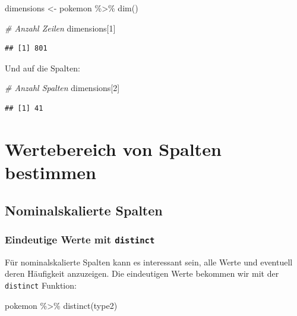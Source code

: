 \documentclass[
]{book}
\newenvironment{Shaded}{\begin{snugshade}}{\end{snugshade}}
\newcommand{\CommentTok}[1]{\textcolor[rgb]{0.56,0.35,0.01}{\textit{#1}}}
\newcommand{\DecValTok}[1]{\textcolor[rgb]{0.00,0.00,0.81}{#1}}
\newcommand{\FunctionTok}[1]{\textcolor[rgb]{0.00,0.00,0.00}{#1}}
\newcommand{\NormalTok}[1]{#1}
\newcommand{\OtherTok}[1]{\textcolor[rgb]{0.56,0.35,0.01}{#1}}
\newcommand{\SpecialCharTok}[1]{\textcolor[rgb]{0.00,0.00,0.00}{#1}}
\begin{document}
\begin{Shaded}
\begin{Highlighting}[]
\NormalTok{dimensions }\OtherTok{\textless{}{-}}\NormalTok{ pokemon }\SpecialCharTok{\%\textgreater{}\%} \FunctionTok{dim}\NormalTok{()}

\CommentTok{\# Anzahl Zeilen}
\NormalTok{dimensions[}\DecValTok{1}\NormalTok{]}
\end{Highlighting}
\end{Shaded}

\begin{verbatim}
## [1] 801
\end{verbatim}

Und auf die Spalten:

\begin{Shaded}
\begin{Highlighting}[]
\CommentTok{\# Anzahl Spalten}
\NormalTok{dimensions[}\DecValTok{2}\NormalTok{]}
\end{Highlighting}
\end{Shaded}

\begin{verbatim}
## [1] 41
\end{verbatim}

\hypertarget{wertebereich-von-spalten-bestimmen}{%
\section{Wertebereich von Spalten bestimmen}\label{wertebereich-von-spalten-bestimmen}}

\hypertarget{wertebereich-nominalskaliert}{%
\subsection{Nominalskalierte Spalten}\label{wertebereich-nominalskaliert}}

\hypertarget{eindeutige-werte-mit-distinct}{%
\subsubsection{\texorpdfstring{Eindeutige Werte mit \texttt{distinct}}{Eindeutige Werte mit distinct}}\label{eindeutige-werte-mit-distinct}}

Für nominalskalierte Spalten kann es interessant sein, alle Werte und eventuell deren Häufigkeit anzuzeigen. Die eindeutigen Werte bekommen wir mit der \texttt{distinct} Funktion:

\begin{Shaded}
\begin{Highlighting}[]
\NormalTok{pokemon }\SpecialCharTok{\%\textgreater{}\%}
  \FunctionTok{distinct}\NormalTok{(type2)}
\end{Highlighting}
\end{Shaded}
\end{document}

